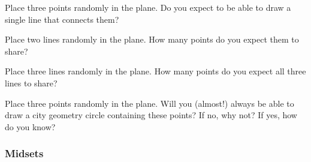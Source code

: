 \begin{ques} 
Place three points randomly in the plane. Do you expect to be able to
draw a single line that connects them?
\end{ques}
\QM

\begin{ques} 
Place two lines randomly in the plane. How many points do you expect
them to share?
\end{ques}
\QM


\begin{ques} 
Place three lines randomly in the plane. How many points do you expect
all three lines to share?
\end{ques}
\QM

\begin{ques} 
Place three points randomly in the plane. Will you (almost!) always be
able to draw a city geometry circle containing these points? If no,
why not? If yes, how do you know?
\end{ques}
\QM



\subsubsection{Midsets}



